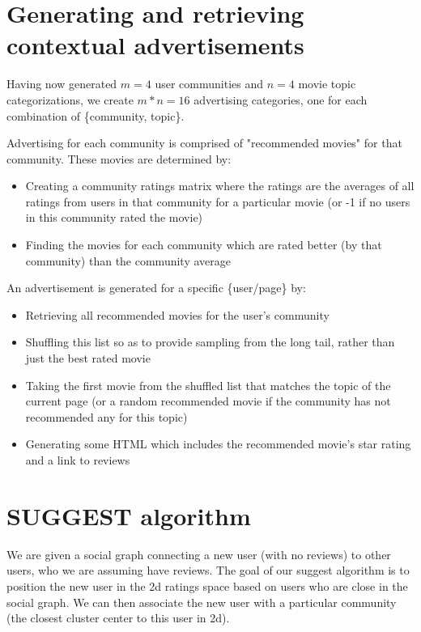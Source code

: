 \documentclass[11pt]{article}
\begin{document}
\section{Generating and retrieving contextual advertisements}

Having now generated $m = 4$ user communities and $n = 4$ movie topic categorizations, we create $m * n = 16$ advertising categories, one for each combination of \{community, topic\}.\newline

Advertising for each community is comprised of "recommended movies" for that community. These movies are determined by:

\begin{itemize}
    \item Creating a community ratings matrix where the ratings are the averages of all ratings from users in that community for a particular movie (or -1 if no users in this community rated the movie)
    \item Finding the movies for each community which are rated better (by that community) than the community average
\end{itemize}

An advertisement is generated for a specific \{user/page\} by:

\begin{itemize}
    \item Retrieving all recommended movies for the user's community
    \item Shuffling this list so as to provide sampling from the long tail, rather than just the best rated movie
    \item Taking the first movie from the shuffled list that matches the topic of the current page (or a random recommended movie if the community has not recommended any for this topic)
    \item Generating some HTML which includes the recommended movie's star rating and a link to reviews
\end{itemize}


\section{SUGGEST algorithm}

We are given a social graph connecting a new user (with no reviews) to other users, who we are assuming have reviews. The goal of our suggest algorithm is to position the new user in the 2d ratings space based on users who are close in the social graph. We can then associate the new user with a particular community (the closest cluster center to this user in 2d).\newline
\end{document}
